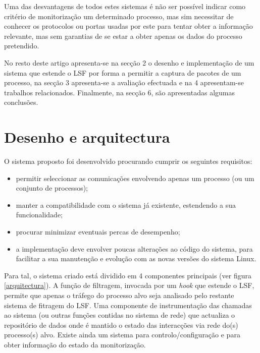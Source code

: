 \documentclass[a4paper]{llncs}
\begin{document}
Uma das desvantagens de todos estes sistemas é não ser possível indicar como critério de monitorização um determinado processo, mas sim necessitar de conhecer os protocolos ou portas usadas por este para tentar obter a informação relevante, mas sem garantias de se estar a obter apenas os dados do processo pretendido.

No resto deste artigo apresenta-se na secção 2 o desenho e implementação de um sistema que estende o LSF por forma a permitir a captura de pacotes de um processo, na secção 3 apresenta-se a avaliação efectuada e na 4 apresentam-se trabalhos relacionados. Finalmente, na secção 6, são apresentadas algumas conclusões.

\section{Desenho e arquitectura}
\label{sec:architecture}

O sistema proposto foi desenvolvido procurando cumprir os seguintes requisitos:
\begin{itemize}
\item permitir seleccionar as comunicações envolvendo apenas um processo (ou um conjunto de processos);
\item manter a compatibilidade com o sistema já existente, estendendo a sua funcionalidade;
\item procurar minimizar eventuais percas de desempenho;
\item a implementação deve envolver poucas alterações ao código do sistema, para facilitar a sua manutenção e evolução com as novas versões do sistema Linux.
\end{itemize}

Para tal, o sistema criado está dividido em 4 componentes principais (ver figura \ref{arquitectura}). A função de filtragem, invocada por um \textit{hook} que estende o LSF, permite que apenas o tráfego do processo alvo seja analisado pelo restante sistema de fitragem do LSF. Uma componente de instrumentação das chamadas ao sistema (ou outras funções contidas no sistema de rede) que actualiza o repositório de dados onde é mantido o estado das interacções via rede do(s) processo(s) alvo. Existe ainda um sistema para controlo/configuração e para obter informação do estado da monitorização.
\end{document}
